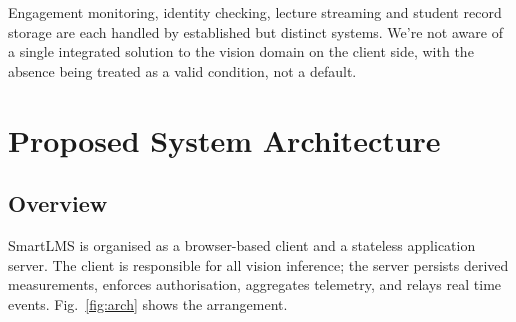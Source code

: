 \documentclass[conference]{IEEEtran}
\begin{document}
Engagement monitoring, identity checking, lecture streaming and
student record storage are each handled by established but distinct systems.
We're not aware of a single integrated solution to the vision domain on the
client side, with the absence being treated as a valid condition, not a default.

\section{Proposed System Architecture}

\subsection{Overview}

SmartLMS is organised as a browser-based client and a stateless
application server. The client is responsible for all vision inference;
the server persists derived measurements, enforces authorisation,
aggregates telemetry, and relays real time events. Fig.~\ref{fig:arch}
shows the arrangement.
\end{document}
